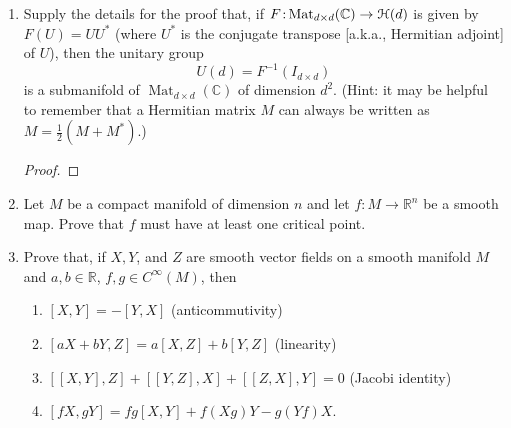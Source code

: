 \documentclass[11pt]{article}
\theoremstyle{definition}
\theoremstyle{definition}
\newcommand{\R}{{\mathbb R}}
\newcommand{\C}{{\mathbb C}}
\newcommand{\from}{\co\!\!}
\def\co{\colon}
\begin{document}
\begin{enumerate}
\begin{enumerate}
\begin{proof}
        \end{proof} 
    \end{enumerate}
	
	
	
	\item Supply the details for the proof that, if $F \from \operatorname{Mat}_{d \times d}(\C) \to \EuScript{H}(d)$ is given by $F(U) = UU^*$ (where $U^*$ is the conjugate transpose [a.k.a., Hermitian adjoint] of $U$), then the unitary group
	\[
		U(d) = F^{-1}(I_{d \times d})
	\]
	is a submanifold of $\operatorname{Mat}_{d \times d}(\C)$ of dimension $d^2$. (Hint: it may be helpful to remember that a Hermitian matrix $M$ can always be written as $M = \frac{1}{2}(M + M^*)$.)
	
    \begin{proof}
        
    \end{proof}

	\item Let $M$ be a compact manifold of dimension $n$ and let $f:M \to \R^n$ be a smooth map. Prove that $f$ must have at least one critical point.
	
	
	\item Prove that, if $X, Y$, and $Z$ are smooth vector fields on a smooth manifold $M$ and $a,b \in \R$, $f,g \in C^\infty (M)$, then
	\begin{enumerate}
		\item $[X,Y] = -[Y,X]$ (anticommutivity)
		\item $[aX+bY,Z] = a[X,Z]+b[Y,Z]$ (linearity)
		\item $[[X,Y],Z] + [[Y,Z],X] + [[Z,X],Y] = 0$ (Jacobi identity)
		\item $[fX,gY] = fg[X,Y] + f(Xg)Y - g(Yf)X$.
	\end{enumerate}
	
		 
\end{enumerate}


	
	
\end{document}
